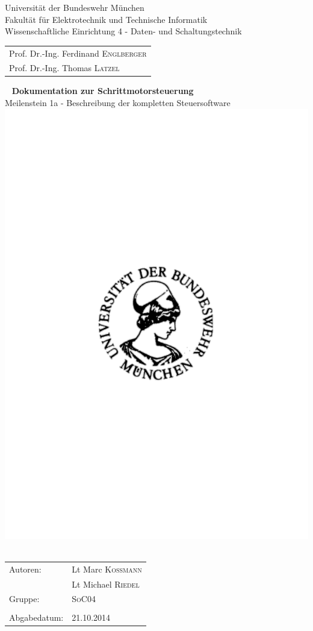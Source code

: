 \begin{titlepage}
    \thispagestyle{empty}
    \begin{center}
        \singlespacing
        {Universität der Bundeswehr München\\
        Fakultät für Elektrotechnik und Technische Informatik\\
        Wissenschaftliche Einrichtung 4 - Daten- und Schaltungstechnik}\\
        \begin{tabular}{l}
            \\
            Prof. Dr.-Ing. Ferdinand \textsc{Englberger}\\
            Prof. Dr.-Ing. Thomas \textsc{Latzel}\\
        \end{tabular}
        
        ~\vfill
        \onehalfspacing 
        \Huge{\bfseries{Dokumentation zur Schrittmotorsteuerung}}\\[0.5cm]
        
        \large{Meilenstein 1a - Beschreibung der kompletten Steuersoftware}
        \\[3cm]
        \includegraphics[width=.25\textwidth,natwidth=228,natheight=224]{../Additions/Images/athene.pdf}~
        \\[3cm]
    \end{center}
    
    \begin{center}
        \singlespacing
        \small{
        \begin{tabular}{l l}
            Autoren: & Lt Marc \textsc{Kossmann}\\
            & Lt Michael \textsc{Riedel}\\
            Gruppe: & \textsc{SoC04}\\
            \\
            Abgabedatum: & 21.10.2014\\
        \end{tabular}}
    \end{center}
\end{titlepage}